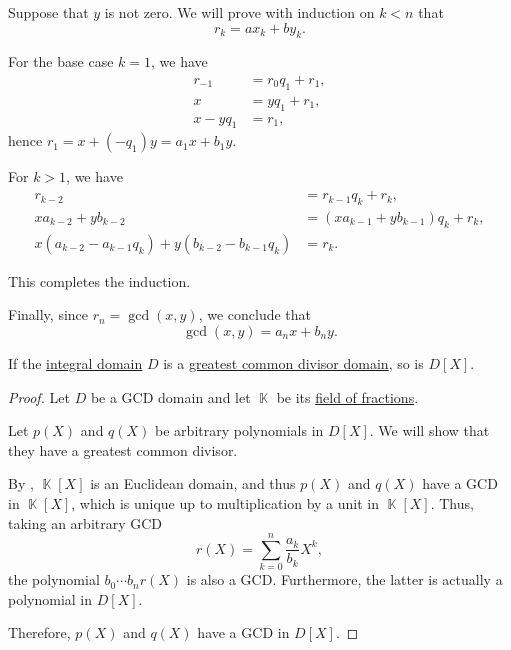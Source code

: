 \begin{defproof}
  Suppose that \( y \) is not zero. We will prove with induction on \( k < n \) that
  \begin{equation*}
    r_k = a x_k + b y_k.
  \end{equation*}

  For the base case \( k = 1 \), we have
  \begin{align*}
    r_{-1}    &= r_0 q_1 + r_1, \\
    x         &= y q_1 + r_1,   \\
    x - y q_1 &= r_1,
  \end{align*}
  hence \( r_1 = x + (-q_1) y = a_1 x + b_1 y \).

  For \( k > 1 \), we have
  \begin{align*}
    r_{k-2}                                               &= r_{k-1} q_k + r_k,                 \\
    x a_{k-2} + y b_{k-2}                                 &= (x a_{k-1} + y b_{k-1}) q_k + r_k, \\
    x (a_{k-2} - a_{k-1} q_k) + y (b_{k-2} - b_{k-1} q_k) &= r_k.
  \end{align*}

  This completes the induction.

  Finally, since \( r_n = \gcd(x, y) \), we conclude that
  \begin{equation*}
    \gcd(x, y) = a_n x + b_n y.
  \end{equation*}
\end{defproof}

\begin{proposition}\label{thm:polynomial_ring_over_gcd_domain}
  If the \hyperref[def:integral_domain]{integral domain} \( D \) is a \hyperref[def:gcd_domain]{greatest common divisor domain}, so is \( D[X] \).
\end{proposition}
\begin{proof}
  Let \( D \) be a GCD domain and let \( \BbbK \) be its \hyperref[thm:field_of_fractions]{field of fractions}.

  Let \( p(X) \) and \( q(X) \) be arbitrary polynomials in \( D[X] \). We will show that they have a greatest common divisor.

  By , \( \BbbK[X] \) is an Euclidean domain, and thus \( p(X) \) and \( q(X) \) have a GCD in \( \BbbK[X] \), which is unique up to multiplication by a unit in \( \BbbK[X] \). Thus, taking an arbitrary GCD
  \begin{equation*}
    r(X) = \sum_{k=0}^n \frac {a_k} {b_k} X^k,
  \end{equation*}
  the polynomial \( b_0 \cdots b_n r(X) \) is also a GCD. Furthermore, the latter is actually a polynomial in \( D[X] \).

  Therefore, \( p(X) \) and \( q(X) \) have a GCD in \( D[X] \).
\end{proof}

